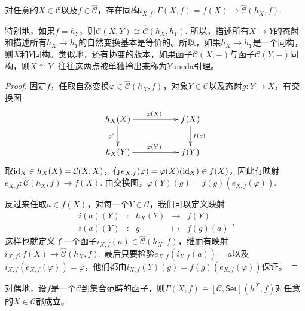 \begin{lem}[Yoneda引理]
对任意的$X\in \mathcal{C}$以及$f\in \hat{\mathcal{C}}$，存在同构$i_{X,f}:\Gamma(X,f)=f(X)\to {\hat{\mathcal{C}}}(h_X,f)$.
\end{lem}

特别地，如果$f=h_Y$，则$\mathcal{C}(X,Y)\cong \hat{\mathcal{C}}(h_X,h_Y)$. 所以，描述所有$X\to Y$的态射和描述所有$h_X\to h_Y$的自然变换基本是等价的。所以，如果$h_X\to h_Y$是一个同构，则$X$和$Y$同构。类似地，还有协变的版本，如果函子$\mathcal{C}(X,-)$与函子$\mathcal{C}(Y,-)$同构，则$X\cong Y$. 往往这两点被单独拎出来称为Yoneda引理。

\begin{proof}
	固定$f$，任取自然变换$\varphi\in {\hat{\mathcal{C}}}(h_X,f)$，对象$Y\in\mathcal{C}$以及态射$g:Y\to X$，有交换图
	\[
	\begin{xy}
		\xymatrix{
			h_X(X)\ar[rr]^{\varphi(X)} \ar[d]_{g^*}&&f(X) \ar[d]^{f(g)}\\
			h_X(Y)\ar[rr]^{\varphi(Y)}&&f(Y)
		}
	\end{xy}
	\]
	取$\operatorname{id}_X\in h_X(X)=\mathcal{C}(X,X)$，有$e_{X,f}(\varphi)=\varphi(X)(\operatorname{id}_X)\in f(X)$，因此有映射$e_{X,f}:{\hat{\mathcal{C}}}(h_X,f)\to f(X)$. 由交换图，$\varphi(Y)(g)=f(g)\left(e_{X,f}(\varphi)\right)$.

	反过来任取$a\in f(X)$，对每一个$Y\in\mathcal{C}$，我们可以定义映射
	\[
	\begin{array}{ccccc}
	i(a)(Y)&:&h_X(Y)&\to &f(Y)\\
	i(a)(Y)&:&g&\mapsto&f(g)(a)
	\end{array},
	\]
	这样也就定义了一个函子$i_{X,f}(a)\in {\hat{\mathcal{C}}}(h_X,f)$，继而有映射$i_{X,f}:f(X)\to {\hat{\mathcal{C}}}(h_X,f)$. 最后只要检验$e_{X,f}(i_{X,f}(a))=a$以及$i_{X,f}(e_{X,f}(\varphi))=\varphi$，他们都由$i_{X,f}(Y)(g)=f(g)\left(e_{X,f}(\varphi)\right)$保证。
\end{proof}

对偶地，设$f$是一个$\mathcal{C}$到集合范畴的函子，则$\Gamma(X,f)\cong [\mathcal{C},\mathsf{Set}](h^X,f)$对任意的$X\in \mathcal{C}$都成立。



